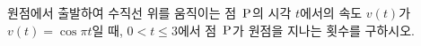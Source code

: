원점에서 출발하여 수직선 위를 움직이는 점~$\mathrm{P}$의 시각 $t$에서의 속도 $v(t)$가 $v(t)=\cos \pi t$일 때, $0<t\le 3$에서 점~$\mathrm{P}$가 원점을 지나는 횟수를 구하시오.
